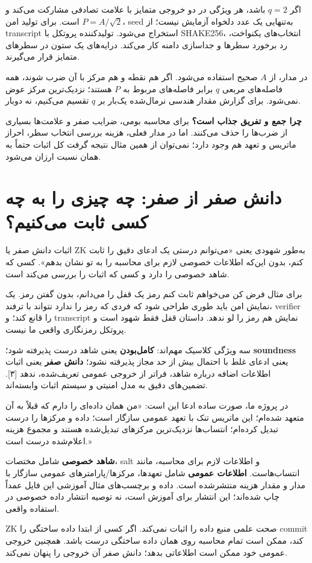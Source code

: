 \documentclass[11pt,a4paper]{article}
\newcommand{\lesson}[1]{\clearpage\section{#1}}
\begin{document}
اگر \(q=2\) باشد، هر ویژگی در دو خروجی متمایز با علامت تصادفی مشارکت می‌کند و \(P=A/\sqrt2\) است. برای تولید امن، seed به‌تنهایی یک عدد دلخواه آزمایش نیست؛ از transcript استخراج می‌شود. تولیدکننده پروتکل با SHAKE256، انتخاب‌های یکنواخت، رد برخورد سطرها و جداسازی دامنه کار می‌کند. درایه‌های یک ستون در سطرهای متمایز قرار می‌گیرند.

در مدار، از \(A\) صحیح استفاده می‌شود. اگر هم نقطه و هم مرکز با آن ضرب شوند، همه فاصله‌های مربعی \(q\) برابر فاصله‌های مربوط به \(P\) هستند؛ نزدیک‌ترین مرکز عوض نمی‌شود. برای گزارش مقدار هندسی نرمال‌شده یک‌بار بر \(q\) تقسیم می‌کنیم، نه دوبار.

\textbf{چرا جمع و تفریق جذاب است؟} برای محاسبه بومی، ضرایب صفر و علامت‌ها بسیاری از ضرب‌ها را حذف می‌کنند. اما در مدار فعلی، هزینه بررسی انتخاب سطر، احراز ماتریس و تعهد هم وجود دارد؛ نمی‌توان از همین مثال نتیجه گرفت کل اثبات حتماً به همان نسبت ارزان می‌شود.

\lesson{دانش صفر از صفر: چه چیزی را به چه کسی ثابت می‌کنیم؟}
اثبات دانش صفر یا ZK به‌طور شهودی یعنی «می‌توانم درستی یک ادعای دقیق را ثابت کنم، بدون این‌که اطلاعات خصوصی لازم برای محاسبه را به تو نشان بدهم». کسی که شاهد خصوصی را دارد  و کسی که اثبات را بررسی می‌کند  است.

برای مثال فرض کن می‌خواهم ثابت کنم رمز یک قفل را می‌دانم، بدون گفتن رمز. یک نمایش امن باید طوری طراحی شود که فردی که رمز را ندارد نتواند با ترفند، verifier را قانع کند؛ و transcript نمایش هم رمز را لو ندهد. داستان قفل فقط شهود است و پروتکل رمزنگاری واقعی ما نیست.

سه ویژگی کلاسیک مهم‌اند: \textbf{کامل‌بودن} یعنی شاهد درست پذیرفته شود؛ \textbf{soundness} یعنی ادعای غلط با احتمال بیش از حد مجاز پذیرفته نشود؛ \textbf{دانش صفر} یعنی اثبات اطلاعات اضافه درباره شاهد، فراتر از خروجی عمومی تعریف‌شده، ندهد [۳]. تضمین‌های دقیق به مدل امنیتی و سیستم اثبات وابسته‌اند.

در پروژه ما، صورت ساده ادعا این است: «من همان داده‌ای را دارم که قبلاً به آن متعهد شده‌ام؛ این ماتریس تنک با تعهد عمومی سازگار است؛ داده و مرکزها را درست تبدیل کرده‌ام؛ انتساب‌ها نزدیک‌ترین مرکزهای تبدیل‌شده هستند و مجموع هزینه اعلام‌شده درست است.»

\textbf{شاهد خصوصی} شامل مختصات، salt و اطلاعات لازم برای محاسبه، مانند انتساب‌هاست. \textbf{اطلاعات عمومی} شامل تعهدها، مرکزها/پارامترهای عمومی سازگار با مدار و مقدار هزینه منتشرشده است. داده و برچسب‌های مثال آموزشی این فایل عمداً چاپ شده‌اند؛ این انتشار برای آموزش است، نه توصیه انتشار داده خصوصی در استفاده واقعی.

ZK صحت علمی منبع داده را اثبات نمی‌کند. اگر کسی از ابتدا داده ساختگی را commit کند، ممکن است تمام محاسبه روی همان داده ساختگی درست باشد. همچنین خروجی عمومی خود ممکن است اطلاعاتی بدهد؛ دانش صفر آن خروجی را پنهان نمی‌کند.
\end{document}
